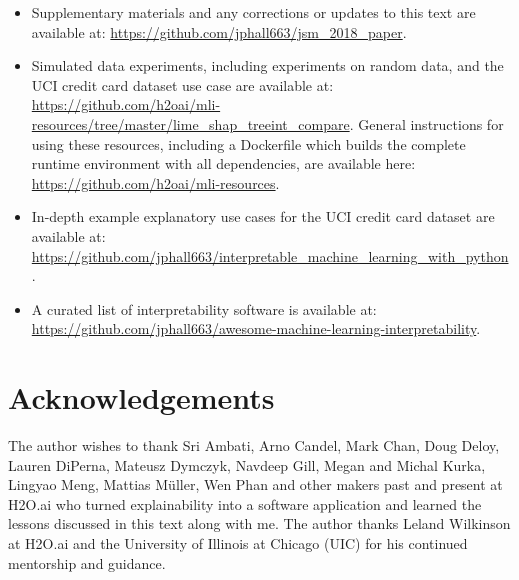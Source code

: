 \documentclass[11pt]{asaproc}
\begin{document}
\begin{itemize}

	\item Supplementary materials and any corrections or updates to this text are available  at: \url{https://github.com/jphall663/jsm_2018_paper}.

	\item Simulated data experiments, including experiments on random data, and the UCI credit card dataset use case are available at: \url{https://github.com/h2oai/mli-resources/tree/master/lime_shap_treeint_compare}. General instructions for using these resources, including a Dockerfile which builds the complete runtime environment with all dependencies, are available here: \url{https://github.com/h2oai/mli-resources}.

	\item In-depth example explanatory use cases for the UCI credit card dataset are available at: \url{https://github.com/jphall663/interpretable_machine_learning_with_python}.

	\item A curated list of interpretability software is available at: \url{https://github.com/jphall663/awesome-machine-learning-interpretability}.

\end{itemize}

\section{Acknowledgements} 

The author wishes to thank Sri Ambati, Arno Candel, Mark Chan,  Doug Deloy, Lauren DiPerna, Mateusz Dymczyk, Navdeep Gill, Megan and Michal Kurka, Lingyao Meng, Mattias M\"uller, Wen Phan and other makers past and present at H2O.ai who turned explainability into a software application and learned the lessons discussed in this text along with me. The author thanks Leland Wilkinson at H2O.ai and the University of Illinois at Chicago (UIC) for his continued mentorship and guidance. 




\end{document}
